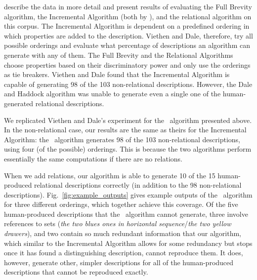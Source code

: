  describe the data in
more detail and present results of evaluating the Full Brevity
algorithm, the Incremental Algorithm (both by ), and
the relational algorithm \cite{dale91:_gener_refer_expres_invol_relat}
on this corpus. The Incremental Algorithm is dependent on a predefined
ordering in which properties are added to the description. Viethen and
Dale, therefore, try all possible orderings and evaluate what
percentage of descriptions an algorithm can generate with any of
them. The Full Brevity and the Relational Algorithms choose properties
based on their discriminatory power and only use the orderings as tie
breakers. Viethen and Dale found that the Incremental Algorithm is
capable of generating 98 of the 103 non-relational
descriptions. However, the Dale and Haddock algorithm was unable to
generate even a single one of the human-generated relational
descriptions.




We replicated Viethen and Dale's experiment for the \el\ algorithm
presented above. In the non-relational case, our results are the same
as theirs for the Incremental Algorithm: the \el\ algorithm generates
98 of the 103 non-relational descriptions, using four (of the
possible) orderings.  This is because the two algorithms perform
essentially the same computations if there are no relations.



When we add relations, our algorithm is able to generate 10 of the 15
human-produced relational descriptions correctly (in addition to the
98 non-relational descriptions).  Fig.~\ref{fig:example_outputs} gives
example outputs of the \el\ algorithm for three different orderings,
which together achieve this coverage.  Of the five human-produced
descriptions that the \el\ algorithm cannot generate, three involve
references to sets (\textit{the two blues ones in horizontal
sequence}/\textit{the two yellow drawers}), and two contain so much
redundant information that our algorithm, which similar to the
Incremental Algorithm allows for some redundancy but stops once it has
found a distinguishing description, cannot reproduce them. It does,
however, generate other, simpler descriptions for all of the
human-produced descriptions that cannot be reproduced exactly.

